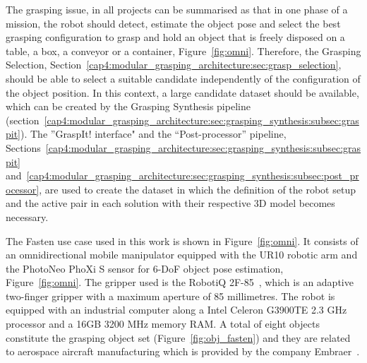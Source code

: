 The grasping issue, in all projects can be summarised as that in one phase of a mission, the robot should detect, estimate the object pose and select the best grasping configuration to grasp and hold an object that is freely disposed on a table, a box, a conveyor or a container, Figure~\ref{fig:omni}. Therefore, the Grasping Selection, Section~\ref{cap4:modular_grasping_architecture:sec:grasp_selection}, should be able to select a suitable candidate independently of the configuration of the object position. In this context, a large candidate dataset should be available, which can be created by the Grasping Synthesis pipeline (section~\ref{cap4:modular_grasping_architecture:sec:grasping_synthesis:subsec:graspit}). The ''GraspIt! interface" and the ``Post-processor'' pipeline, Sections~\ref{cap4:modular_grasping_architecture:sec:grasping_synthesis:subsec:graspit} and~\ref{cap4:modular_grasping_architecture:sec:grasping_synthesis:subsec:post_processor}, are used to create the dataset in which the definition of the robot setup and the active pair in each solution with their respective 3D model becomes necessary.

The Fasten use case used in this work is shown in Figure~\ref{fig:omni}. It consists of an omnidirectional mobile manipulator equipped with the UR10 robotic arm and the PhotoNeo PhoXi S sensor for 6-DoF object pose estimation, Figure~\ref{fig:omni}. The gripper used is the RobotiQ 2F-85~\cite{robotiq_grippers}, which is an adaptive two-finger gripper with a maximum aperture of 85 millimetres. The robot is equipped with an industrial computer along a Intel Celeron G3900TE 2.3 GHz processor and a 16GB 3200 MHz memory RAM. A total of eight objects constitute the grasping object set (Figure~\ref{fig:obj_fasten}) and they are related to aerospace aircraft manufacturing which is provided by the company Embraer~\cite{embraer_pt}.

\begin{figure}[h!]
\end{figure}


